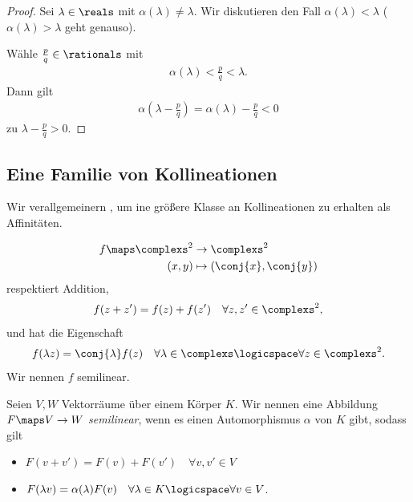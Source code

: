\begin{proof}
    Sei \( \lambda\in \reals \) mit \( \alpha(\lambda)\neq \lambda \). Wir diskutieren den Fall \( \alpha(\lambda)<\lambda \) (\( \alpha(\lambda)>\lambda \) geht genauso).

    Wähle \( \frac{p}{q}\in \rationals \) mit
    \begin{align*}
        \alpha(\lambda)<\frac{p}{q}<\lambda.
    \end{align*}
    Dann gilt
    \begin{align*}
        \alpha(\lambda-\frac{p}{q})=\alpha(\lambda)-\frac{p}{q}<0
    \end{align*}
    \contra zu \( \lambda-\frac{p}{q}>0 \).
\end{proof}

\subsection*{Eine Familie von Kollineationen}
\begin{idee*}
    Wir verallgemeinern , um ine größere Klasse an Kollineationen zu erhalten als Affinitäten.
\end{idee*}
\begin{beispiel}
    \begin{align*}
        f\maps \begin{aligned}[t]
            \complexs^2&\to \complexs^2\\
            (x,y)&\mapsto (\conj{x},\conj{y})
        \end{aligned}
    \end{align*}
    respektiert Addition, \dh
    \begin{align*}
        f(z+z')=f(z)+f(z')\quad \forall z,z'\in \complexs^2,
    \end{align*}
    und hat die Eigenschaft
    \begin{align*}
        f(\lambda z)=\conj{\lambda} f(z)\quad \forall \lambda\in \complexs\logicspace \forall z\in \complexs^2.
    \end{align*}
    \tto Wir nennen \( f \) semilinear.
\end{beispiel}
\begin{definition*}
    Seien \( V,W \) Vektorräume über einem Körper \( K \). Wir nennen eine Abbildung \( F\maps V\to W \) \emph{semilinear}, wenn es einen Automorphismus \( \alpha \) von \( K \) gibt, sodass gilt
    \begin{itemize}
        \item \(F(v+v')=F(v)+F(v')\quad \forall v,v'\in V\)
        \item \( F(\lambda v)=\alpha(\lambda) F(v)\quad \forall \lambda\in K \logicspace \forall v\in V\).
    \end{itemize}
\end{definition*}
